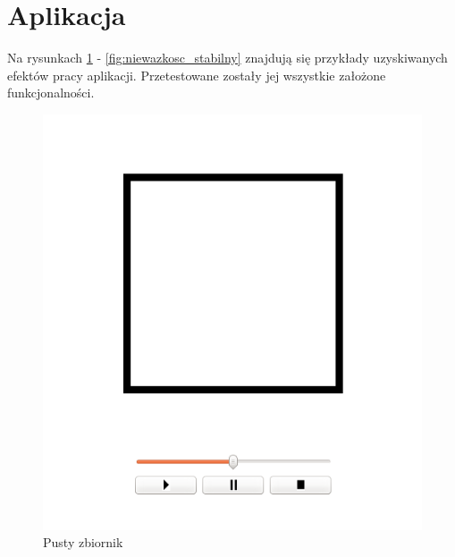 
\section{Aplikacja}
Na rysunkach \ref{fig:pusty} - \ref{fig:niewazkosc_stabilny} znajdują się przykłady uzyskiwanych efektów pracy aplikacji. Przetestowane zostały jej wszystkie założone funkcjonalności.

\begin{minipage}{0.5\textwidth}
\begin{figure}[H]
 \begin{center}
  \includegraphics[width=\textwidth]{./rysunki/pusty}
 \end{center}
 \caption{Pusty zbiornik}
 \label{fig:pusty}
\end{figure}
\end{minipage}
~

